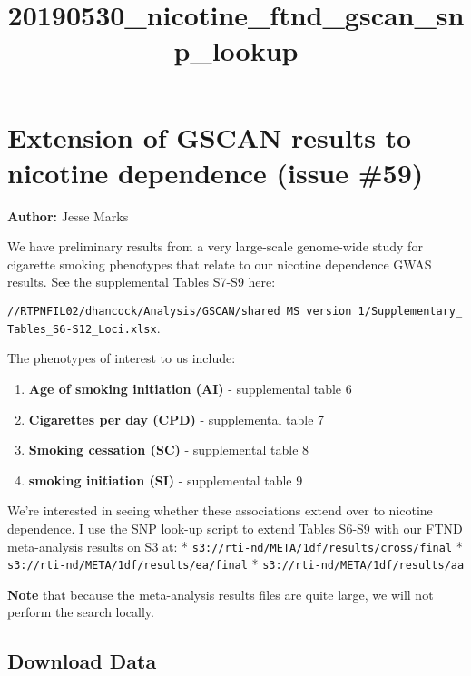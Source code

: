 \documentclass[11pt]{article}
\title{20190530\_nicotine\_ftnd\_gscan\_snp\_lookup}
\begin{document}
    
    
    \maketitle
    
    

    
    \hypertarget{extension-of-gscan-results-to-nicotine-dependence-issue-59}{%
\section{Extension of GSCAN results to nicotine dependence (issue
\#59)}\label{extension-of-gscan-results-to-nicotine-dependence-issue-59}}

\textbf{Author:} Jesse Marks

We have preliminary results from a very large-scale genome-wide study
for cigarette smoking phenotypes that relate to our nicotine dependence
GWAS results. See the supplemental Tables S7-S9 here:

\texttt{//RTPNFIL02/dhancock/Analysis/GSCAN/shared\ MS\ version\ 1/Supplementary\_Tables\_S6-S12\_Loci.xlsx}.

The phenotypes of interest to us include:

\begin{enumerate}
\def\labelenumi{\arabic{enumi})}
\item
  \textbf{Age of smoking initiation (AI)} - supplemental table 6
\item
  \textbf{Cigarettes per day (CPD)} - supplemental table 7
\item
  \textbf{Smoking cessation (SC)} - supplemental table 8
\item
  \textbf{smoking initiation (SI)} - supplemental table 9
\end{enumerate}

We're interested in seeing whether these associations extend over to
nicotine dependence. I use the SNP look-up script to extend Tables S6-S9
with our FTND meta-analysis results on S3 at: *
\texttt{s3://rti-nd/META/1df/results/cross/final} *
\texttt{s3://rti-nd/META/1df/results/ea/final} *
\texttt{s3://rti-nd/META/1df/results/aa}

\textbf{Note} that because the meta-analysis results files are quite
large, we will not perform the search locally.

    \hypertarget{download-data}{%
\subsection{Download Data}\label{download-data}}
\end{document}
